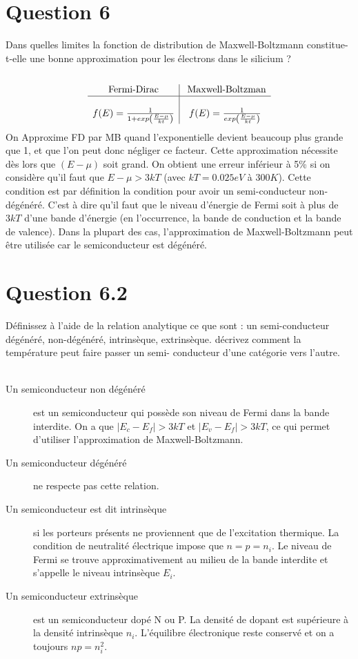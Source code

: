 \section{Question 6}
Dans quelles limites la fonction de distribution de Maxwell-Boltzmann constitue-t-elle une bonne approximation pour les électrons dans le silicium ?
\\
\hbox{}
\\
\begin{equation}
\begin{array}{c| c}
\mbox{Fermi-Dirac} &\mbox{ Maxwell-Boltzman} \\ 
\hline \\
f(E)=\frac{1}{1+exp\left(\frac{E-\mu}{kt}\right) } & f(E)=\frac{1}{exp\left( \frac{E-\mu}{kt} \right) }\\ 
\end{array} 
\end{equation}
On Approxime FD par MB quand l'exponentielle devient beaucoup plus grande que 1, et que l'on peut donc négliger ce facteur. Cette approximation nécessite dès lors que $(E-\mu)$ soit grand. On obtient une erreur inférieur à 5\% si on considère qu'il faut que $E-\mu>3kT$ (avec $kT=0.025eV$ à $300K$). Cette condition est par définition la condition pour avoir un semi-conducteur non-dégénéré. C'est à dire qu'il faut que le niveau d'énergie de Fermi soit à plus de $3kT$ d'une bande d'énergie (en l'occurrence, la bande de conduction et la bande de valence). Dans la plupart des cas, l'approximation de Maxwell-Boltzmann peut être utilisée car le semiconducteur est dégénéré.
\section*{Question 6.2}
Définissez à l'aide de la relation analytique ce que sont : un semi-conducteur dégénéré, non-dégénéré, intrinsèque, extrinsèque. décrivez comment la température peut faire passer un semi- conducteur d'une catégorie vers l'autre. \\
\hbox{} \\
\begin{description}
\item [Un semiconducteur non dégénéré] est un semiconducteur qui possède son niveau de Fermi dans la bande interdite.  On a que $ | E_c-E_f | > 3kT$ et $ | E_v-E_f | > 3kT$, ce qui permet d'utiliser l'approximation de Maxwell-Boltzmann.
\item [Un semiconducteur dégénéré] ne respecte pas cette relation.
\item[Un semiconducteur est dit intrinsèque] si les porteurs présents ne proviennent que de l'excitation thermique. La condition de neutralité électrique impose que $n = p = n_i$.  Le niveau de Fermi se trouve approximativement au milieu de la bande interdite et s'appelle le niveau intrinsèque $E_i$.
\item[Un semiconducteur extrinsèque] est un semiconducteur dopé N ou P. La densité de dopant est supérieure à la densité intrinsèque $n_i$. L'équilibre électronique reste conservé et on a toujours $np = n_i^2$.
\end{description}

